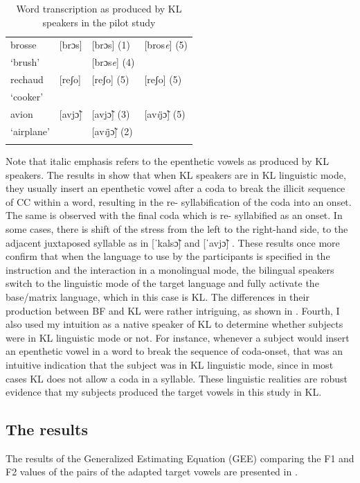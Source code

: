 \documentclass[output=paper]{langscibook}
\begin{document}
\begin{table}
\begin{tabular}{*4{l}}
    brosse & [brɔs] & [brɔs] (1) & [bros\textit{e}] (5) \\
    `brush' &  & [brɔs\textit{e}] (4) & \\
    \tablevspace

    rechaud & [reʃo] & [reʃo] (5) & [reʃo] (5) \\
    `cooker' & & & \\
    \tablevspace

    avion & [avjɔ̃] &  [avjɔ̃] (3) & [av\textit{i}jɔ̃] (5) \\
    `airplane' & & [av\textit{i}jɔ̃] (2) & \\
    \lspbottomrule
    \end{tabular}
    \caption{Word transcription as produced by KL speakers in the pilot study}
    \label{tab:pilot}
\end{table}

Note that italic emphasis refers to the epenthetic vowels as produced by KL speakers. The results in  show that when KL speakers are in KL linguistic mode, they usually insert an epenthetic vowel after a coda to break the illicit sequence of CC within a word, resulting in the re- syllabification of the coda into an onset. The same is observed with the final coda which is re- syllabified as an onset. In some cases, there is shift of the stress from the left to the right-hand side, to the adjacent juxtaposed syllable as in [ˈkalsɔ̃] \to [kaˈlesɔ̃] and [ˈavjɔ̃]
\to [aˈvijɔ̃]. These results once more confirm that when the language to use by the participants is specified in the instruction and the interaction in a monolingual mode, the bilingual speakers switch to the linguistic mode of the target language and fully activate the base/matrix language, which in this case is KL. The differences in their production between BF and KL were rather intriguing, as shown in . Fourth, I also used my intuition as a native speaker of KL to determine whether subjects were in KL linguistic mode or not. For instance, whenever a subject would insert an epenthetic vowel in a word to break the sequence of coda-onset, that was an intuitive indication that the subject was in KL linguistic mode, since in most cases KL does not allow a coda in a syllable. These linguistic realities are robust evidence that my subjects produced the target vowels in this study in KL.

\subsection{The results}
The results of the Generalized Estimating Equation (GEE) comparing the F1 and F2 values of the pairs of the adapted target vowels are presented in .
\end{document}
